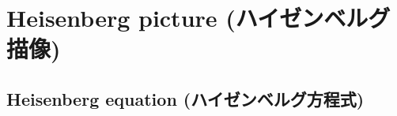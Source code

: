 %
%
%
%
%
\section{Heisenberg picture (ハイゼンベルグ描像)}


\subsection{Heisenberg equation (ハイゼンベルグ方程式)}


